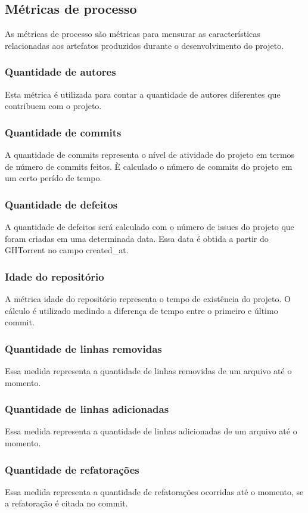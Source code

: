 \subsection{Métricas de processo}
As métricas de processo são métricas para mensurar as características relacionadas aos artefatos produzidos durante o desenvolvimento do projeto.

\subsubsection{Quantidade de autores}
Esta métrica é utilizada para contar a quantidade de autores diferentes que contribuem com o projeto.
\subsubsection{Quantidade de commits}
A quantidade de commits representa o nível de atividade do projeto em termos de número de commits feitos. È calculado o número de commits do projeto em um certo perído de tempo. 
\subsubsection{Quantidade de defeitos}
A quantidade de defeitos será calculado com o número de issues do projeto que foram criadas em uma determinada data. Essa data é obtida a partir do GHTorrent no campo created\_at.
\subsubsection{Idade do repositório}
A métrica idade do repositório representa o tempo de existência do projeto. O cálculo é utilizado medindo a diferença de tempo entre o primeiro e último commit.
\subsubsection{Quantidade de linhas removidas}
Essa medida representa a quantidade de linhas removidas de um arquivo até o momento.
\subsubsection{Quantidade de linhas adicionadas}
Essa medida representa a quantidade de linhas adicionadas de um arquivo até o momento.
\subsubsection{Quantidade de refatorações}
Essa medida representa a quantidade de refatorações ocorridas até o momento, se a refatoração é citada no commit.
